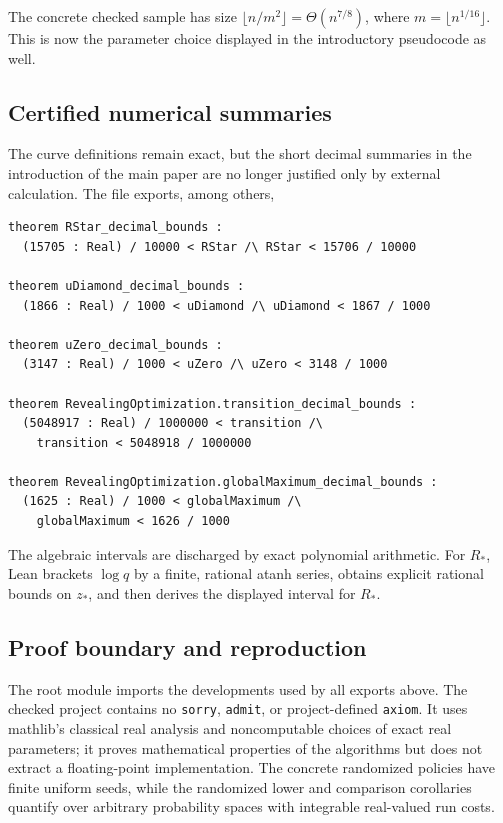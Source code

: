 The concrete checked sample has size
$\lfloor n/m^2\rfloor=\Theta(n^{7/8})$, where
$m=\lfloor n^{1/16}\rfloor$.  This is now the parameter choice displayed in
the introductory pseudocode as well.

\subsection{Certified numerical summaries}

The curve definitions remain exact, but the short decimal summaries in the
introduction of the main paper are no longer justified only by external
calculation.  The file
 exports, among others,

\begin{lstlisting}[style=lean]
theorem RStar_decimal_bounds :
  (15705 : Real) / 10000 < RStar /\ RStar < 15706 / 10000

theorem uDiamond_decimal_bounds :
  (1866 : Real) / 1000 < uDiamond /\ uDiamond < 1867 / 1000

theorem uZero_decimal_bounds :
  (3147 : Real) / 1000 < uZero /\ uZero < 3148 / 1000

theorem RevealingOptimization.transition_decimal_bounds :
  (5048917 : Real) / 1000000 < transition /\
    transition < 5048918 / 1000000

theorem RevealingOptimization.globalMaximum_decimal_bounds :
  (1625 : Real) / 1000 < globalMaximum /\
    globalMaximum < 1626 / 1000
\end{lstlisting}

The algebraic intervals are discharged by exact polynomial arithmetic.  For
$R_*$, Lean brackets $\log q$ by a finite, rational atanh series, obtains
explicit rational bounds on $z_*$, and then derives the displayed interval
for $R_*$.

\subsection{Proof boundary and reproduction}

The root module  imports the developments used by
all exports above.  The checked project contains no \texttt{sorry},
\texttt{admit}, or project-defined \texttt{axiom}.  It uses mathlib's
classical real analysis and noncomputable choices of exact real parameters;
it proves mathematical properties of the algorithms but does not extract a
floating-point implementation.  The concrete randomized policies have finite
uniform seeds, while the randomized lower and comparison corollaries quantify
over arbitrary probability spaces with integrable real-valued run costs.

